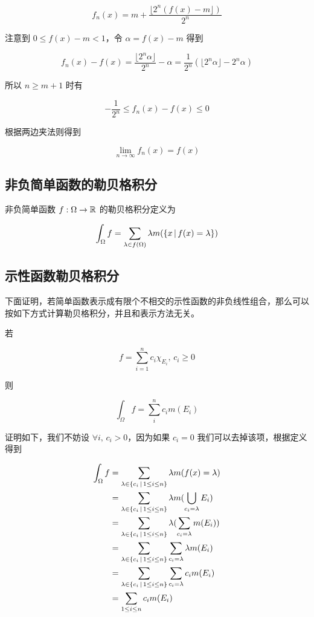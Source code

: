 \[
f_n(x) = m + \frac{\lfloor 2^n(f(x) - m \rfloor)}{2^n} 
\]

注意到 $0 \le f(x) -m < 1$，令 $\alpha = f(x) -m$ 得到

\[
f_n(x) -f(x) =\frac{\lfloor 2^n \alpha \rfloor}{2^n} - \alpha  = \frac{1}{2^n} (\lfloor2^n \alpha \rfloor-2^n\alpha)
\]

所以 $n \ge m + 1$ 时有

\[
- \frac{1}{2^n}\le f_n(x) -f(x) \le 0
\]

根据两边夹法则得到 

\[
\lim_{n \to \infty}f_n(x) = f(x)
\]


\subsection{非负简单函数的勒贝格积分}
非负简单函数 $f: \Omega \to \mathbb{R} $ 的勒贝格积分定义为

\[
\int_{\Omega}f = \sum_{\lambda \in f(\Omega)} \lambda m(\{ x \,\vert\, f(x) = \lambda \})
\]

\subsection{示性函数勒贝格积分}

下面证明，若简单函数表示成有限个不相交的示性函数的非负线性组合，那么可以按如下方式计算勒贝格积分，并且和表示方法无关。

若

\[
f = \sum_{i=1}^{n}c_i\chi_{E_i},\, c_i \ge 0
\]

则

\[
\int_{\Omega} f = \sum_{i}^{n}c_im(E_i)
\]

证明如下，我们不妨设 $\forall i,\, c_i > 0$，因为如果 $c_i = 0$ 我们可以去掉该项，根据定义得到

\begin{align*}
\int_{\Omega} f &= \sum_{\lambda \in \{ c_i \,\vert\, 1 \le i \le n\}}\lambda m(f(x) = \lambda)  \\
    & = \sum_{\lambda \in \{ c_i \,\vert\, 1 \le i \le n\}}\lambda m(\bigcup_{c_i = \lambda }E_i) \\
    & = \sum_{\lambda \in \{ c_i \,\vert\, 1 \le i \le n\}}\lambda (\sum_{c_i = \lambda}m(E_i)) \\
    & = \sum_{\lambda \in \{ c_i \,\vert\, 1 \le i \le n\}}\sum_{c_i = \lambda}\lambda m(E_i) \\
    & = \sum_{\lambda \in \{ c_i \,\vert\, 1 \le i \le n\}}\sum_{c_i = \lambda}c_i m(E_i)  \\
    & = \sum_{1 \le i \le n}c_i m(E_i)  \\
\end{align*}


